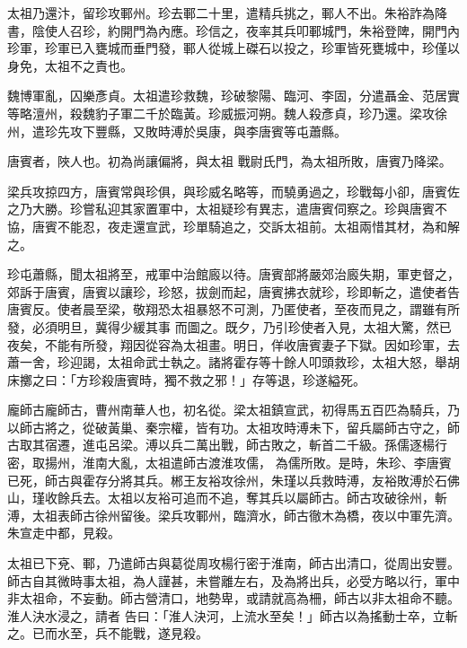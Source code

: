 \begin{pinyinscope}
 太祖乃還汴，留珍攻鄆州。珍去鄆二十里，遣精兵挑之，鄆人不出。朱裕詐為降書，陰使人召珍，約開門為內應。珍信之，夜率其兵叩鄆城門，朱裕登陴，開門內珍軍，珍軍已入甕城而垂門發，鄆人從城上磔石以投之，珍軍皆死甕城中，珍僅以身免，太祖不之責也。



 魏博軍亂，囚樂彥貞。太祖遣珍救魏，珍破黎陽、臨河、李固，分遣聶金、范居實等略澶州，殺魏豹子軍二千於臨黃。珍威振河朔。魏人殺彥貞，珍乃還。梁攻徐州，遣珍先攻下豐縣，又敗時溥於吳康，與李唐賓等屯蕭縣。



 唐賓者，陜人也。初為尚讓偏將，與太祖
 戰尉氏門，為太祖所敗，唐賓乃降梁。



 梁兵攻掠四方，唐賓常與珍俱，與珍威名略等，而驍勇過之，珍戰每小卻，唐賓佐之乃大勝。珍嘗私迎其家置軍中，太祖疑珍有異志，遣唐賓伺察之。珍與唐賓不協，唐賓不能忍，夜走還宣武，珍單騎追之，交訴太祖前。太祖兩惜其材，為和解之。



 珍屯蕭縣，聞太祖將至，戒軍中治館廄以待。唐賓部將嚴郊治廄失期，軍吏督之，郊訴于唐賓，唐賓以讓珍，珍怒，拔劍而起，唐賓拂衣就珍，珍即斬之，遣使者告唐賓反。使者晨至梁，敬翔恐太祖暴怒不可測，乃匿使者，至夜而見之，謂雖有所發，必須明旦，冀得少緩其事
 而圖之。既夕，乃引珍使者入見，太祖大驚，然已夜矣，不能有所發，翔因從容為太祖畫。明日，佯收唐賓妻子下獄。因如珍軍，去蕭一舍，珍迎謁，太祖命武士執之。諸將霍存等十餘人叩頭救珍，太祖大怒，舉胡床擲之曰：「方珍殺唐賓時，獨不救之邪！」存等退，珍遂縊死。



 龐師古龐師古，曹州南華人也，初名從。梁太祖鎮宣武，初得馬五百匹為騎兵，乃以師古將之，從破黃巢、秦宗權，皆有功。太祖攻時溥未下，留兵屬師古守之，師古取其宿遷，進屯呂梁。溥以兵二萬出戰，師古敗之，斬首二千級。孫儒逐楊行密，取揚州，淮南大亂，太祖遣師古渡淮攻儒，
 為儒所敗。是時，朱珍、李唐賓已死，師古與霍存分將其兵。郴王友裕攻徐州，朱瑾以兵救時溥，友裕敗溥於石佛山，瑾收餘兵去。太祖以友裕可追而不追，奪其兵以屬師古。師古攻破徐州，斬溥，太祖表師古徐州留後。梁兵攻鄆州，臨濟水，師古徹木為橋，夜以中軍先濟。朱宣走中都，見殺。



 太祖已下兗、鄆，乃遣師古與葛從周攻楊行密于淮南，師古出清口，從周出安豐。師古自其微時事太祖，為人謹甚，未嘗離左右，及為將出兵，必受方略以行，軍中非太祖命，不妄動。師古營清口，地勢卑，或請就高為柵，師古以非太祖命不聽。淮人決水浸之，請者
 告曰：「淮人決河，上流水至矣！」師古以為搖動士卒，立斬之。已而水至，兵不能戰，遂見殺。




\end{pinyinscope}
